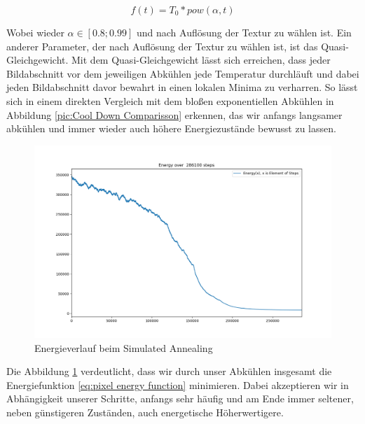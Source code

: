 \begin{tcolorbox}[rightrule=3mm, rounded corners=east]
    \begin{equation}\label{eq:ExponentialKirkpatrick}
        f(t) = T_0 * pow(\alpha,t)
      \end{equation}
\end{tcolorbox}

Wobei wieder $\alpha \in [0.8; 0.99]$ und nach Auflösung der Textur zu wählen ist. Ein anderer Parameter, der nach 
Auflösung der Textur zu wählen ist, ist das Quasi-Gleichgewicht. Mit dem Quasi-Gleichgewicht lässt sich erreichen, 
dass jeder Bildabschnitt vor dem jeweiligen Abkühlen jede Temperatur durchläuft und dabei jeden Bildabschnitt davor 
bewahrt in einen lokalen Minima zu verharren.
So lässt sich in einem direkten Vergleich mit dem bloßen exponentiellen Abkühlen in Abbildung 
\ref{pic:Cool Down Comparisson} erkennen, das wir anfangs langsamer abkühlen und immer wieder auch 
höhere Energiezustände bewusst zu lassen.

\begin{figure}[H]
    \centering
    \includegraphics[width=\linewidth]{content/simulatedAnnealing/Bilder/Energy_286100_steps_KirkpatrickCooldownSchedule.png}
    \caption{Energieverlauf beim Simulated Annealing}
    \label{pic:kirkpatrick energie verlauf}
\end{figure}

Die Abbildung \ref{pic:kirkpatrick energie verlauf} verdeutlicht, dass wir durch unser Abkühlen insgesamt die 
Energiefunktion \ref{eq:pixel energy function} minimieren. Dabei akzeptieren wir in Abhängigkeit unserer Schritte,
anfangs sehr häufig und am Ende immer seltener, neben günstigeren Zuständen, auch energetische Höherwertigere.


